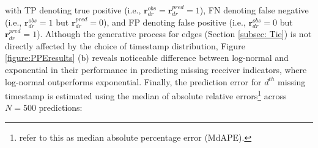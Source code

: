 \documentclass[ba]{imsart}
\numberwithin{equation}{section}
\theoremstyle{plain}
\begin{document}
	with TP denoting true positive (i.e., $\boldsymbol{r}^{obs}_{dr}=\boldsymbol{r}^{pred}_{dr}=1$), FN denoting false negative (i.e., $\boldsymbol{r}^{obs}_{dr}=1$ but $\boldsymbol{r}^{pred}_{dr}=0$), and FP denoting false positive (i.e., $\boldsymbol{r}^{obs}_{dr}=0$ but $\boldsymbol{r}^{pred}_{dr}=1$). Although the generative process for edges (Section \ref{subsec: Tie}) is not directly affected by the choice of timestamp distribution, Figure \ref{figure:PPEresults} (b) reveals noticeable difference between log-normal and exponential in their performance in predicting missing receiver indicators, where log-normal outperforms exponential. Finally, the prediction error for $d^{th}$ missing timestamp is estimated using the median of absolute relative errors\footnote{\cite{hyndman2006another} refer to this as median absolute percentage error (MdAPE).} across $N=500$ predictions:
\end{document}
